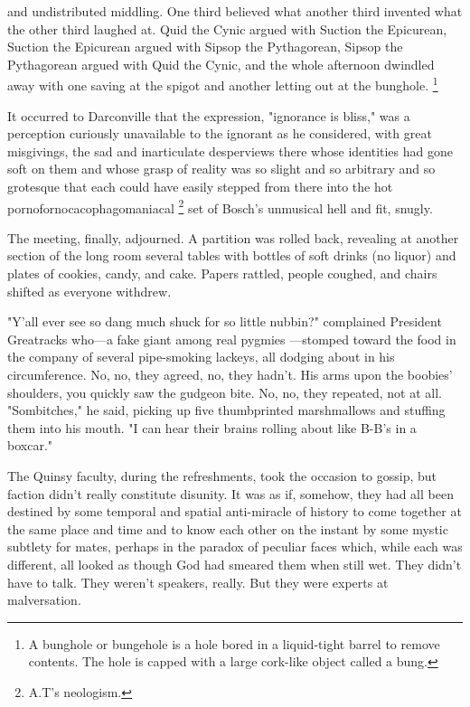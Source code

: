 and undistributed middling.
One third believed what another third invented what the other third laughed at.
Quid the Cynic argued with Suction the Epicurean, Suction the Epicurean argued
with Sipsop the Pythagorean, Sipsop the Pythagorean argued with Quid the Cynic,
and the whole afternoon dwindled away with one saving at the spigot 
and another letting out at the bunghole.
\footnote{A bunghole or bungehole is a hole bored in a liquid-tight barrel to remove contents. The hole is capped with a large cork-like object called a bung. }

  It occurred to Darconville that the expression, "ignorance is bliss," was a
perception curiously unavailable to the ignorant as he considered, with great
misgivings, the sad and inarticulate desperviews there whose identities had gone
soft on them and whose grasp of reality was so slight and so arbitrary and so
grotesque that each could have easily stepped from there into the hot
pornofornocacophagomaniacal 
\footnote{\textdbend A.T's neologism.}
set of Bosch's unmusical hell and fit, snugly.

  The meeting, finally, adjourned. 
A partition was rolled back, revealing at
another section of the long room several tables with bottles of soft drinks (no
liquor) and plates of cookies, candy, and cake. Papers rattled, 
people coughed, and chairs shifted as everyone withdrew.

  "Y'all ever see so dang much shuck for so little nubbin?" complained President
Greatracks who---a fake giant among real pygmies ---stomped toward the food in the
company of several pipe-smoking lackeys, all dodging about in his circumference.
No, no, they agreed, no, they hadn't. His arms upon the boobies' shoulders, you
quickly saw the gudgeon bite. No, no, they repeated, not at all. "Sombitches,"
he said, picking up five thumbprinted marshmallows and stuffing them into his
mouth. "I can hear their brains rolling about like B-B's in a boxcar."

  The Quinsy faculty, during the refreshments, took the occasion to gossip, but
faction didn't really constitute disunity. It was as if, somehow, they had all
been destined by some temporal and spatial anti-miracle of history to come
together at the same place and time and to know each other on the instant by
some mystic subtlety for mates, perhaps in the paradox of peculiar faces which,
while each was different, all looked as though God had smeared them when still
wet. They didn't have to talk. They weren't speakers, really. But they were
experts at malversation.

